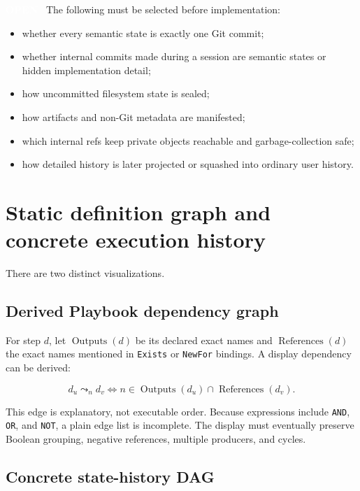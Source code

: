 \documentclass[11pt]{article}
\newcommand{\statuspill}[2]{%
  \begingroup\setlength{\fboxsep}{3pt}%
  \colorbox{#1}{\textcolor{white}{\sffamily\bfseries\scriptsize #2}}%
  \endgroup}
\newcommand{\Open}{\statuspill{Amber}{OPEN}}
\newcommand{\artifact}[1]{\texttt{#1}}
\begin{document}
\Open\ The following must be selected before implementation:

\begin{itemize}
  \item whether every semantic state is exactly one Git commit;
  \item whether internal commits made during a session are semantic states or hidden implementation detail;
  \item how uncommitted filesystem state is sealed;
  \item how artifacts and non-Git metadata are manifested;
  \item which internal refs keep private objects reachable and garbage-collection safe;
  \item how detailed history is later projected or squashed into ordinary user history.
\end{itemize}

\section{Static definition graph and concrete execution history}

There are two distinct visualizations.

\subsection{Derived Playbook dependency graph}

For step \(d\), let \(\operatorname{Outputs}(d)\) be its declared exact names and \(\operatorname{References}(d)\) the exact names mentioned in \artifact{Exists} or \artifact{NewFor} bindings. A display dependency can be derived:

\begin{equation}
 d_u \leadsto_n d_v
 \iff n \in \operatorname{Outputs}(d_u) \cap \operatorname{References}(d_v).
\end{equation}

This edge is explanatory, not executable order. Because expressions include \texttt{AND}, \texttt{OR}, and \texttt{NOT}, a plain edge list is incomplete. The display must eventually preserve Boolean grouping, negative references, multiple producers, and cycles.

\subsection{Concrete state-history DAG}
\end{document}
